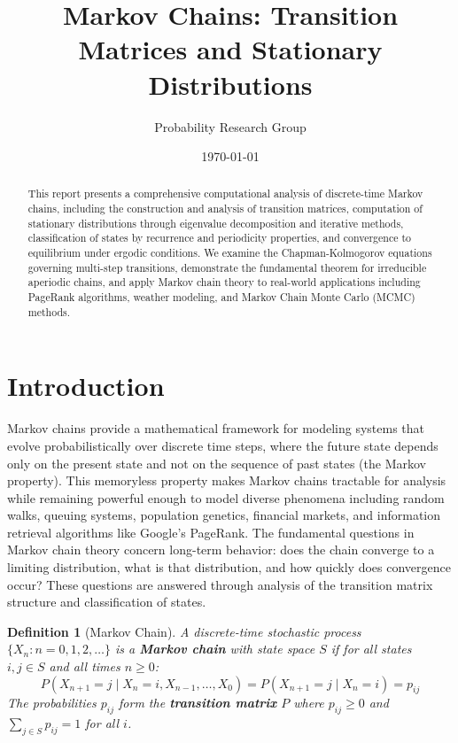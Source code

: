 \documentclass[11pt,a4paper]{article}
\title{Markov Chains: Transition Matrices and Stationary Distributions}
\author{Probability Research Group}
\date{\today}
\newtheorem{definition}{Definition}[section]
\begin{document}
\maketitle

\begin{abstract}
This report presents a comprehensive computational analysis of discrete-time Markov chains, including the construction and analysis of transition matrices, computation of stationary distributions through eigenvalue decomposition and iterative methods, classification of states by recurrence and periodicity properties, and convergence to equilibrium under ergodic conditions. We examine the Chapman-Kolmogorov equations governing multi-step transitions, demonstrate the fundamental theorem for irreducible aperiodic chains, and apply Markov chain theory to real-world applications including PageRank algorithms, weather modeling, and Markov Chain Monte Carlo (MCMC) methods.
\end{abstract}

\section{Introduction}

Markov chains provide a mathematical framework for modeling systems that evolve probabilistically over discrete time steps, where the future state depends only on the present state and not on the sequence of past states (the Markov property). This memoryless property makes Markov chains tractable for analysis while remaining powerful enough to model diverse phenomena including random walks, queuing systems, population genetics, financial markets, and information retrieval algorithms like Google's PageRank. The fundamental questions in Markov chain theory concern long-term behavior: does the chain converge to a limiting distribution, what is that distribution, and how quickly does convergence occur? These questions are answered through analysis of the transition matrix structure and classification of states.

\begin{definition}[Markov Chain]
A discrete-time stochastic process $\{X_n : n = 0, 1, 2, \ldots\}$ is a \textbf{Markov chain} with state space $S$ if for all states $i, j \in S$ and all times $n \geq 0$:
\begin{equation}
P(X_{n+1} = j \mid X_n = i, X_{n-1}, \ldots, X_0) = P(X_{n+1} = j \mid X_n = i) = p_{ij}
\end{equation}
The probabilities $p_{ij}$ form the \textbf{transition matrix} $P$ where $p_{ij} \geq 0$ and $\sum_{j \in S} p_{ij} = 1$ for all $i$.
\end{definition}
\end{document}
